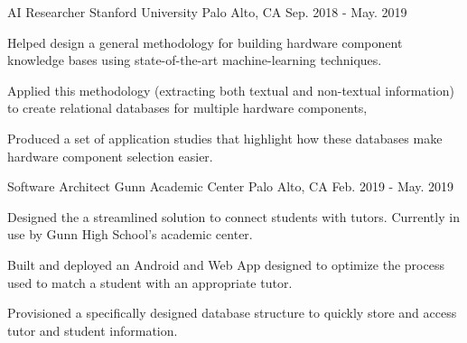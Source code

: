 

\begin{cventries}

  \cventry
    {AI Researcher} %
    {Stanford University} %
    {Palo Alto, CA} %
    {Sep. 2018 - May. 2019} %
    {
      \begin{cvitems} %
        \item {Helped design a general methodology for building hardware component knowledge
		bases using state-of-the-art machine-learning techniques.}
	\item {Applied this methodology (extracting both textual and non-textual
		information) to create relational databases
		for multiple hardware components, }
	\item {Produced a set of application studies that highlight how
		these databases make hardware component selection easier.}
      \end{cvitems}
    }

  \cventry
    {Software Architect} %
    {Gunn Academic Center} %
    {Palo Alto, CA} %
    {Feb. 2019 - May. 2019} %
    {
      \begin{cvitems} %
        \item {Designed the a streamlined solution to connect students with
		tutors. Currently in use by Gunn High School's
		academic center.}
        \item {Built and deployed an Android and Web App designed to optimize
		the process used to match a student with an appropriate
		tutor.}
        \item {Provisioned a specifically designed database structure to
		quickly store and access tutor and student information.}
      \end{cvitems}
    }

\end{cventries}
